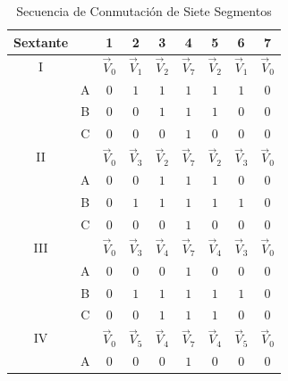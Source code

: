\documentclass[11pt]{report}
\begin{document}
\begin{table}[htbp]
	\centering
	\caption{Secuencia de Conmutación de Siete Segmentos}
	\begin{tabular}{c c c c c c c c c }
		\hline
		\textbf{Sextante} &   & \textbf{1}  & \textbf{2}  & \textbf{3}  & \textbf{4}  & \textbf{5}  & \textbf{6}  & \textbf{7}  \\
		\hline
		I                 &   & $\vec{V}_0$ & $\vec{V}_1$ & $\vec{V}_2$ & $\vec{V}_7$ & $\vec{V}_2$ & $\vec{V}_1$ & $\vec{V}_0$ \\
		                  & A & $0$         & $1$         & $1$         & $1$         & $1$         & $1$         & $0$         \\
		                  & B & $0$         & $0$         & $1$         & $1$         & $1$         & $0$         & $0$         \\
		                  & C & $0$         & $0$         & $0$         & $1$         & $0$         & $0$         & $0$         \\
		\hline
		II                &   & $\vec{V}_0$ & $\vec{V}_3$ & $\vec{V}_2$ & $\vec{V}_7$ & $\vec{V}_2$ & $\vec{V}_3$ & $\vec{V}_0$ \\
		                  & A & $0$         & $0$         & $1$         & $1$         & $1$         & $0$         & $0$         \\
		                  & B & $0$         & $1$         & $1$         & $1$         & $1$         & $1$         & $0$         \\
		                  & C & $0$         & $0$         & $0$         & $1$         & $0$         & $0$         & $0$         \\
		\hline
		III               &   & $\vec{V}_0$ & $\vec{V}_3$ & $\vec{V}_4$ & $\vec{V}_7$ & $\vec{V}_4$ & $\vec{V}_3$ & $\vec{V}_0$ \\
		                  & A & $0$         & $0$         & $0$         & $1$         & $0$         & $0$         & $0$         \\
		                  & B & $0$         & $1$         & $1$         & $1$         & $1$         & $1$         & $0$         \\
		                  & C & $0$         & $0$         & $1$         & $1$         & $1$         & $0$         & $0$         \\
		\hline
		IV                &   & $\vec{V}_0$ & $\vec{V}_5$ & $\vec{V}_4$ & $\vec{V}_7$ & $\vec{V}_4$ & $\vec{V}_5$ & $\vec{V}_0$ \\
		                  & A & $0$         & $0$         & $0$         & $1$         & $0$         & $0$         & $0$         \\

\end{tabular}
\end{table}
\end{document}
